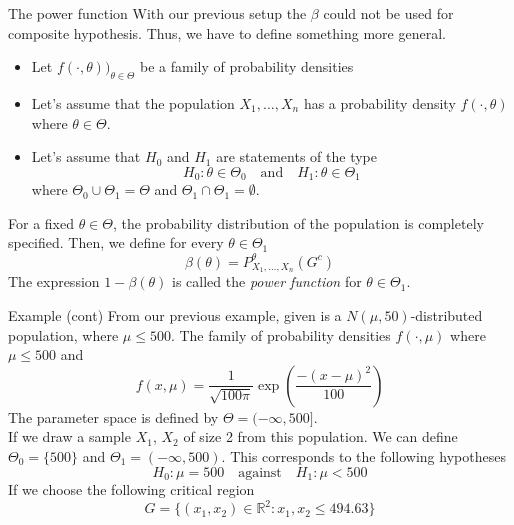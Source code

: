\documentclass{beamer}
\begin{document}
\begin{frame}{The power function}
	With our previous setup the $\beta$ could not be used for composite hypothesis. Thus, we have to define something more general. 
	\begin{itemize}
		\item Let $f(\cdot, \theta))_{\theta \in \Theta}$ be a family of probability densities 
		\item Let's assume that the population $X_1,\ldots, X_n$  has a probability density $f(\cdot,\theta)$ where $\theta \in \Theta$.  
		\item Let's assume that $H_0$ and $H_1$ are statements of the type
		\begin{equation*}
			H_0 \colon \theta \in \Theta_0 \quad \text{and} \quad H_1\colon \theta \in \Theta_1
		\end{equation*}
	where $\Theta_0 \cup \Theta_1= \Theta$ and $\Theta_1 \cap \Theta_1= \emptyset$.
	
	\end{itemize}
	For a fixed $\theta \in \Theta$, the probability distribution of the population is completely specified. Then, we define for every $\theta \in \Theta_1$
	\begin{equation*}
		\beta(\theta)= P_{X_1,\ldots, X_n}^\theta (G^c)
	\end{equation*}
	The expression $1-\beta(\theta)$ is called the \textit{power function} for $\theta \in \Theta_1$.
\end{frame}

\begin{frame}{Example (cont)}
	From our previous example, given is a $N(\mu, 50)$-distributed population, where $\mu \le 500$. 
	The family of probability densities $f(\cdot, \mu)$ where $\mu\le 500$ and 
	\begin{equation*}
		f(x,\mu)= \frac{1}{\sqrt{100 \pi}} \exp(\frac{-(x-\mu)^2}{100})
	\end{equation*}
	The parameter space is defined by $\Theta=(-\infty, 500]$. \\
	If we draw a sample $X_1$, $X_2$ of size 2 from this population. We can define $\Theta_0=\{500\}$ and $\Theta_1= (-\infty, 500)$. This corresponds to the following hypotheses
	\begin{equation*}
		H_0 \colon \mu = 500 \quad \text{against} \quad H_1 \colon \mu< 500
	\end{equation*}
If we choose the following critical region 
\begin{equation*}
	G= \{ (x_1,x_2)\in \mathbb{R}^2: x_1, x_2 \le 494.63 \}
\end{equation*}

	
\end{frame}
\end{document}
